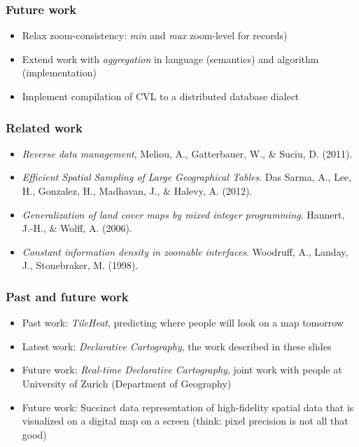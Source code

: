 \documentclass{beamer}
\begin{document}
\frame
{
  \frametitle{Future work}
  \begin{itemize}
  \item Relax zoom-consistency: \emph{min} and \emph{max} zoom-level for records)
  \item Extend work with \emph{aggregation} in language (semantics) and algorithm (implementation)
  \item Implement compilation of CVL to a distributed database dialect
  \end{itemize}
}


\frame
{
  \frametitle{Related work}

  \begin{itemize}
  \item \emph{Reverse data management}, Meliou, A., Gatterbauer, W., \& Suciu, D. (2011).
  \item \emph{Efficient Spatial Sampling of Large Geographical Tables}. Das Sarma, A., Lee, H., Gonzalez, H., Madhavan, J., \& Halevy, A. (2012).
  \item \emph{Generalization of land cover maps by mixed integer programming}. Haunert, J.-H., \& Wolff, A. (2006). 
  \item \emph{Constant information density in zoomable interfaces}. Woodruff, A., Landay, J., Stonebraker, M. (1998).
  \end{itemize}
}

\frame
{
  \frametitle{Past and future work}

  \begin{itemize}
  \item Past work: \emph{TileHeat}, predicting where people will look on a map tomorrow
  \item Latest work: \emph{Declarative Cartography}, the work described in these slides
  \item Future work: \emph{Real-time Declarative Cartography}, joint work with people at University of Zurich (Department of Geography)
  \item Future work: Succinct data representation of high-fidelity spatial data that is visualized on a digital map on a screen (think: pixel precision is not all that good)
  \end{itemize}
}
\end{document}
